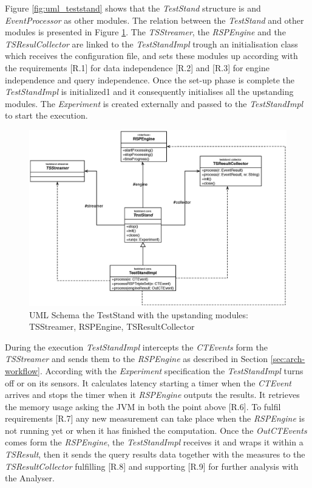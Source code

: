 Figure \ref{fig:uml_teststand} shows that the \textit{TestStand} structure is and \textit{EventProcessor} as other modules. The relation between the \textit{TestStand} and other modules is presented in Figure \ref{fig:uml_teststand_modules}. The \textit{TSStreamer}, the \textit{RSPEngine} and the \textit{TSResulCollector} are linked to the \textit{TestStandImpl} trough an initialisation class which receives the configuration file, and sets these modules up according with the requirements [R.1] for data independence  [R.2] and [R.3] for engine independence and query independence. Once the set-up phase is complete the \textit{TestStandImpl} is initialized1 and it consequently initialises all the upstanding modules. The \textit{Experiment} is created externally and passed to the \textit{TestStandImpl} to start the execution. 

\begin{figure}[tbh]
  \centering
	\includegraphics[width=0.90\linewidth]{images/uml_teststand_modules}
	\caption{UML Schema the TestStand with the upstanding modules: TSStreamer, RSPEngine, TSResultCollector} 
  	\label{fig:uml_teststand_modules}
\end{figure}

During the execution \textit{TestStandImpl} intercepts the \textit{CTEvents} form the \textit{TSStreamer} and sends them to the \textit{RSPEngine} as described in Section \ref{sec:arch-workflow}. According with the \textit{Experiment} specification the \textit{TestStandImpl} turns off or on its sensors. It calculates latency starting a timer when the \textit{CTEvent} arrives and stops the timer when it \textit{RSPEngine} outputs the results. It retrieves the memory usage asking the JVM in both the point above [R.6]. To fulfil requirements [R.7] any new measurement can take place  when the \textit{RSPEngine} is not running yet or when it has finished the computation. Once the \textit{OutCTEvents} comes form the \textit{RSPEngine}, the \textit{TestStandImpl} receives it and wraps it within a \textit{TSResult}, then it sends the query results data together with the measures to the \textit{TSResultCollector} fulfilling [R.8] and supporting [R.9] for further analysis with the Analyser.
%

